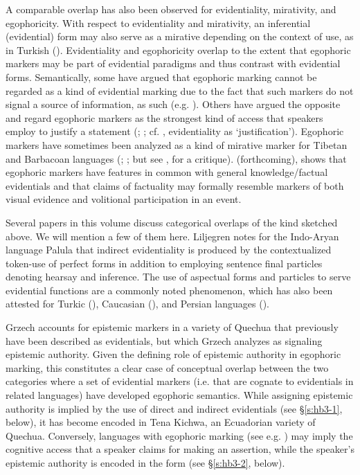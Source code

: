 \documentclass[output=paper]{langsci/langscibook}
\begin{document}
A comparable overlap has also been observed for evidentiality, mirativity, and egophoricity. With respect to evidentiality and mirativity, an inferential (evidential) form may also serve as a mirative depending on the context of use, as in Turkish (\citealt{SlobinAksu1982}). Evidentiality and egophoricity overlap to the extent that egophoric markers may be part of evidential paradigms and thus contrast with evidential forms. Semantically, some have argued that egophoric marking cannot be regarded as a kind of evidential marking due to the fact that such markers do not signal a source of information, as such (e.g. \citealt{Aikhenvald2004}). Others have argued the opposite and regard egophoric markers as the strongest kind of access that speakers employ to justify a statement (\citealt{Plungian2010}; \citealt{SanRoqueLoughnane2012}; cf. \citealt{Boye2012}, evidentiality as ‘justification’). Egophoric markers have sometimes been analyzed as a kind of mirative marker for Tibetan and Barbacoan languages (\citealt{DeLancey1997}; \citealt{Dickinson2000}; but see \citealt{Curnow2002}, for a critique). \citeauthor{Kittila} (forthcoming), shows that egophoric markers have features in common with general knowledge/factual evidentials and that claims of factuality may formally resemble markers of both visual evidence and volitional participation in an event.

Several papers in this volume discuss categorical overlaps of the kind sketched above. We will mention a few of them here. Liljegren notes for the Indo-Aryan language Palula that indirect evidentiality is produced by the contextualized token-use of perfect forms in addition to employing sentence final particles denoting hearsay and inference. The use of aspectual forms and particles to serve evidential functions are a commonly noted phenomenon, which has also been attested for Turkic (\citealt{SlobinAksu1982}), Caucasian (\citealt{Tatevosov2001}), and Persian languages (\citealt{Lazard1996}).

Grzech accounts for epistemic markers in a variety of Quechua that previously have been described as evidentials, but which Grzech analyzes as signaling epistemic authority. Given the defining role of epistemic authority in egophoric marking, this constitutes a clear case of conceptual overlap between the two categories where a set of evidential markers (i.e. that are cognate to evidentials in related languages) have developed egophoric semantics. While assigning epistemic authority is implied by the use of direct and indirect evidentials (see §\ref{s:hb3-1}, below), it has become encoded in Tena Kichwa, an Ecuadorian variety of Quechua. Conversely, languages with egophoric marking (see e.g. \citealt{Tournadre2008}) may imply the cognitive access that a speaker claims for making an assertion, while the speaker’s epistemic authority is encoded in the form (see §\ref{s:hb3-2}, below).
\end{document}
